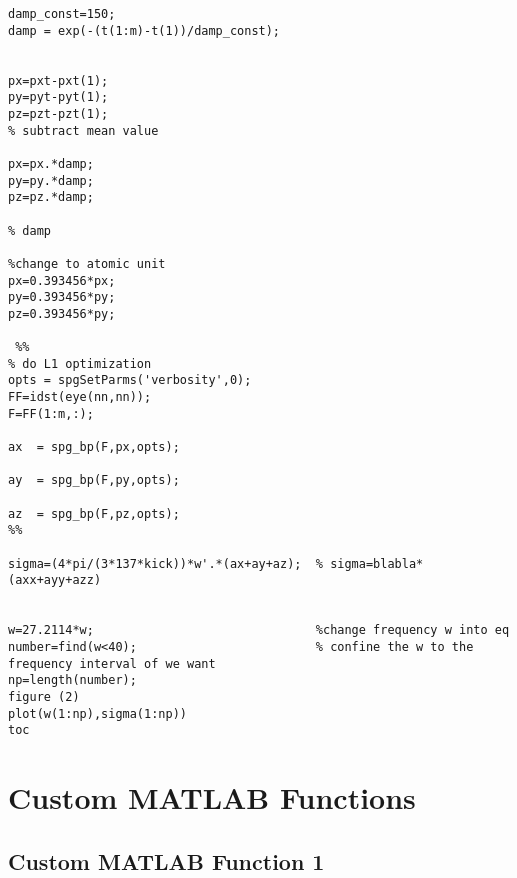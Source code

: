 \documentclass[11pt]{article}
\begin{document}
\begin{appendices}
\begin{verbatim}
damp_const=150;
damp = exp(-(t(1:m)-t(1))/damp_const);

 
px=pxt-pxt(1);
py=pyt-pyt(1);
pz=pzt-pzt(1);
% subtract mean value

px=px.*damp;
py=py.*damp;
pz=pz.*damp;

% damp

%change to atomic unit
px=0.393456*px;
py=0.393456*py;
pz=0.393456*py;

 %% 
% do L1 optimization
opts = spgSetParms('verbosity',0); 
FF=idst(eye(nn,nn));
F=FF(1:m,:);
 
ax  = spg_bp(F,px,opts); 

ay  = spg_bp(F,py,opts); 

az  = spg_bp(F,pz,opts); 
%%
 
sigma=(4*pi/(3*137*kick))*w'.*(ax+ay+az);  % sigma=blabla*(axx+ayy+azz)

 
w=27.2114*w;                               %change frequency w into eq
number=find(w<40);                         % confine the w to the frequency interval of we want
np=length(number);                         
figure (2)
plot(w(1:np),sigma(1:np))
toc
\end{verbatim}

\section{Custom MATLAB Functions} 	%

\subsection*{Custom MATLAB Function 1}


\end{appendices}
\end{document}

